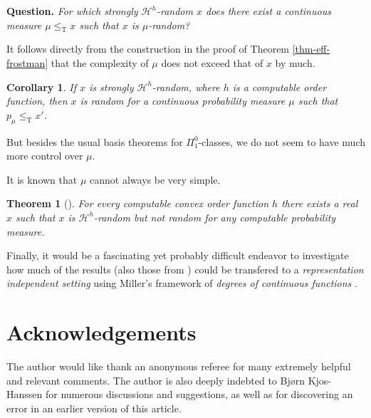 \documentclass[11pt,reqno]{article}
\theoremstyle{plain}
\newtheorem{thm}{Theorem}
\newtheorem*{cor*}{Corollary}
\theoremstyle{definition}
\theoremstyle{remark}
\numberwithin{equation}{section}
\newcommand{\Hmeas}{\ensuremath{\mathcal{H}}}
\newcommand{\Hm}[1]{\ensuremath{\Hmeas^{#1}}}
\DeclareMathOperator{\T}{T}
\begin{document}
\textbf{Question.} \emph{For which strongly $\Hm{h}$-random $x$ does there exist a continuous measure $\mu \leq_{\T} x$ such that $x$ is $\mu$-random?}

It follows directly from the construction in the proof of Theorem \ref{thm-eff-frostman}     that the complexity of $\mu$ does not exceed that of $x$ by much.

\begin{cor*}
	If $x$ is strongly $\Hm{h}$-random, where $h$ is a computable order function, then $x$ is random for a continuous probability measure $\mu$ such that $p_\mu \leq_{\T} x'$.
\end{cor*}

But besides the usual basis theorems for $\Pi^0_1$-classes, we do not seem to have much more control over $\mu$.

It is known that $\mu$ cannot always be very simple.

\begin{thm}[\citet{reimann:2004}]
	For every computable convex order function $h$ there exists a real $x$ such that $x$ is $\Hm{h}$-random but not random for any computable probability measure.
\end{thm}

Finally, it would be a fascinating yet probably difficult endeavor to investigate how much of the results (also those from \citep{reimann-slaman:ip2}) could be transfered to a \emph{representation independent setting} using Miller's framework of \emph{degrees of continuous functions} \citep{miller:2004}.  




% 
% 
\section{Acknowledgements} \label{sec-acknow}

The author would like thank an anonymous referee for many extremely helpful and relevant comments.  The author is also deeply indebted to Bj{\o}rn Kjos-Hanssen for numerous discussions and suggestions, as well as for discovering an error in an earlier version of this article.
\end{document}
